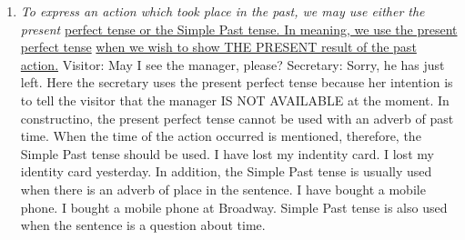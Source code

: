 \begin{enumerate}
    \item {\it To express an action which took place in the past, we may
        use either the present}
        \newline
        \underline{perfect tense or the Simple Past tense. In meaning, we use
        the present perfect tense}
        \newline
        \underline{when we wish to show THE PRESENT result of the past action.}
        \newline
        \newline
        Visitor: May I see the manager, please?
        \newline
        \newline
        Secretary: Sorry, he has just left.
        \newline
        \newline
        Here the secretary uses the present perfect tense because her intention
        is to tell the visitor that the manager IS NOT AVAILABLE at the moment.
        \newline
        \newline
        In constructino, the present perfect tense cannot be used with an adverb
        of past time.
        When the time of the action occurred is mentioned, therefore, the Simple
        Past tense should be used.
        \newline
        \newline
        I have lost my indentity card.
        \newline
        \newline
        I lost my identity card yesterday.
        \newline
        \newline
        In addition, the Simple Past tense is usually used when there is an
        adverb of place in the sentence.
        \newline
        \newline
        I have bought a mobile phone.
        \newline
        \newline
        I bought a mobile phone at Broadway.
        \newline
        \newline
        Simple Past tense is also used when the sentence is a question about
        time.
        \newline
        \newline

\end{enumerate}
